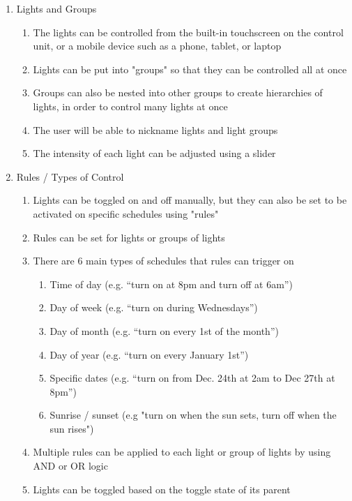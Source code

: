 \documentclass[oneside,openright]{book}
\begin{document}
\begin{enumerate}
    \item Lights and Groups
    \begin{enumerate}
        \item The lights can be controlled from the built-in touchscreen on the
            control unit, or a mobile device such as a phone, tablet, or laptop
        \item Lights can be put into "groups" so that they can be controlled
            all at once
        \item Groups can also be nested into other groups to create hierarchies
            of lights, in order to control many lights at once
        \item The user will be able to nickname lights and light groups
        \item The intensity of each light can be adjusted using a slider
    \end{enumerate}
    \item Rules / Types of Control
    \begin{enumerate}
        \item Lights can be toggled on and off manually, but they can also be
            set to be activated on specific schedules using "rules"
        \item Rules can be set for lights or groups of lights
        \item There are 6 main types of schedules that rules can trigger on
        \begin{enumerate}
            \item Time of day (e.g. “turn on at 8pm and turn off at 6am”) 
            \item Day of week (e.g. “turn on during Wednesdays”)
            \item Day of month (e.g. “turn on every 1st of the month”)
            \item Day of year (e.g. “turn on every January 1st”)
            \item Specific dates (e.g. “turn on from Dec. 24th at 2am to Dec
                27th at 8pm”)
            \item Sunrise / sunset (e.g "turn on when the sun sets, turn off
                when the sun rises")
        \end{enumerate}
        \item Multiple rules can be applied to each light or group of lights by
            using AND or OR logic
        \item Lights can be toggled based on the toggle state of its parent

\end{enumerate}
\end{enumerate}
\end{document}
